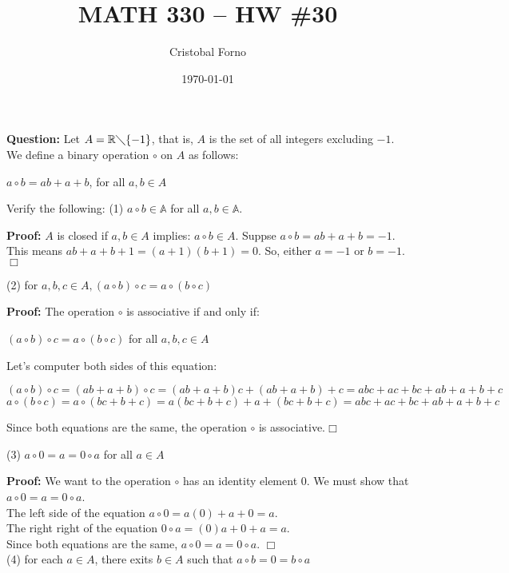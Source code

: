 \documentclass[12pt]{article}
\title{MATH 330 -- HW \#30}
\author{Cristobal Forno}
\date{\today}
\begin{document}
\maketitle

\textbf{Question:} Let $A = \mathbb{R} \diagdown \{-1\}$, that is, $A$ is the set of all
integers excluding $-1$. We define a binary operation $\circ$ on $A$ as follows:
\begin{center}
  $a \circ b = ab +a +b$, for all $a,b \in A$
\end{center}
Verify the following:
\newline
(1) $a \circ b \in \mathbb{A}$ for all $a,b \in \mathbb{A}$.

\noindent
\textbf{Proof:}
$A$ is closed if $a, b \in A$ implies: $a \circ b \in A$. Suppse $a \circ b = ab +
a + b = -1$. This means $ab + a + b +1 = (a+1) (b+1) = 0$. So, either $a = -1$ or
$b = -1$. $\Box$

\noindent
(2) for $a, b, c \in A, (a \circ b) \circ c = a \circ (b \circ c)$

\noindent
\textbf{Proof:}
The operation $\circ$ is associative if and only if:
\begin{center}
  $(a \circ b) \circ c = a \circ (b \circ c)$ for all $a, b, c \in A$
\end{center}
Let's computer both sides of this equation:
\begin{center}
  $(a \circ b) \circ c = (ab + a + b) \circ c = (ab+a+b)c + (ab+a+b) + c =
  abc+ac+bc+ab+a+b+c$\\
  $a \circ (b \circ c) = a \circ (bc + b +c) = a(bc+b+c)+a+(bc+b+c) =
  abc+ac+bc+ab+a+b+c$
\end{center}
Since both equations are the same, the operation $\circ$ is associative.$\Box$
  
\noindent
(3) $a \circ 0 = a = 0 \circ a$ for all $a \in A$

\noindent
\textbf{Proof:}
We want to the operation $\circ$ has an identity element $0$. We must show that $a \circ 0 = a = 0 \circ a$.\\
The left side of the equation $a \circ 0 = a(0)+a +0 = a$.\\
The right right of the equation $0 \circ a = (0)a + 0 + a = a$.\\
Since both equations are the same, $a \circ 0 = a = 0 \circ a$. $\Box$ \\

\noindent
(4) for each $a \in A$, there exits $b \in A$ such that $a \circ b = 0 = b \circ
a$
\end{document}
